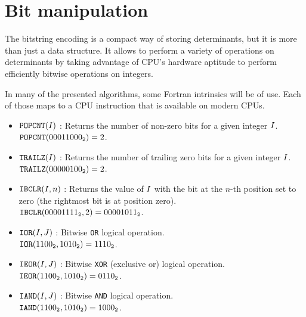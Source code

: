 \documentclass[./thesis.tex]{subfiles}
\begin{document}
      
\section{Bit manipulation}

The bitstring encoding is a compact way of storing determinants, but it is more than just a data structure. It allows to perform a variety of operations on determinants by taking advantage of CPU's hardware aptitude to perform efficiently bitwise operations on integers.

In many of the presented algorithms, some Fortran intrinsics will be of use. Each of those maps to a CPU instruction that is available on modern CPUs.


\begin{sloppypar}
\begin{itemize}
	      
	\item $\text{\texttt{POPCNT}}({{{I}}})$ :
	Returns the number of non-zero bits for a given integer ${{{I}}}$. \\
        ${\text{\texttt{POPCNT}}({00011000_{\mathtt{2}}}) = 2}$.
	      
	\item $\text{\texttt{TRAILZ}}({{{I}}})$ : Returns the number of trailing zero bits for a given integer ${{{I}}}$. \\
         ${\text{\texttt{TRAILZ}}({00000100_{\mathtt{2}}}) = 2}$.
	      
	      
	\item $\text{\texttt{IBCLR}}({{{I}}},n)$ : Returns the value of ${{{I}}}$ with the bit at the $n$-th position set to zero (the rightmost bit is at position zero). \\
        ${\text{\texttt{IBCLR}}({00001111_{\mathtt{2}}},2) = {00001011_{\mathtt{2}}}}$.
	      
	     
   	\item $\text{\texttt{IOR}}({{{I}}},{{{J}}})$ : Bitwise \texttt{OR} logical operation. \\
        ${\text{\texttt{IOR}}({1100_{\mathtt{2}}},{1010_{\mathtt{2}}}) = {1110_{\mathtt{2}}}}$.

	 
	\item $\text{\texttt{IEOR}}({{{I}}},{{{J}}})$ : Bitwise \texttt{XOR} (exclusive or) logical operation. \\
        ${\text{\texttt{IEOR}}({1100_{\mathtt{2}}},{1010_{\mathtt{2}}}) = {0110_{\mathtt{2}}}}$.
	      
	      
	\item $\text{\texttt{IAND}}({{{I}}},{{{J}}})$ : Bitwise \texttt{AND} logical operation. \\
        ${\text{\texttt{IAND}}({1100_{\mathtt{2}}},{1010_{\mathtt{2}}}) = {1000_{\mathtt{2}}}}$.
	      

\end{itemize}
\end{sloppypar}
\end{document}
